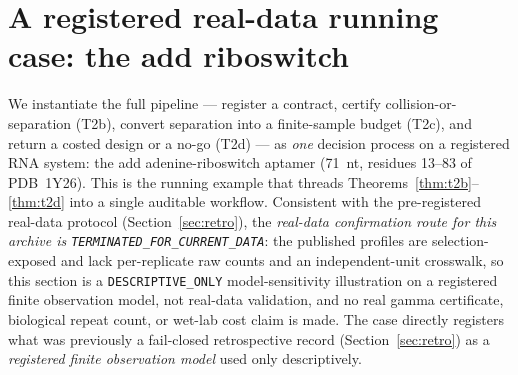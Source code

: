 \documentclass[11pt]{article}
\begin{document}
\section{A registered real-data running case: the add riboswitch}\label{sec:real}

We instantiate the full pipeline --- register a contract, certify collision-or-separation (T2b),
convert separation into a finite-sample budget (T2c), and return a costed design or a no-go (T2d) ---
as \emph{one} decision process on a registered RNA system: the add adenine-riboswitch aptamer
(71~nt, residues 13--83 of PDB~1Y26). This is the running example that threads
Theorems~\ref{thm:t2b}--\ref{thm:t2d} into a single auditable workflow. Consistent with the
pre-registered real-data protocol (Section~\ref{sec:retro}), the \emph{real-data confirmation route
for this archive is \texttt{TERMINATED\_FOR\_CURRENT\_DATA}}: the published profiles are
selection-exposed and lack per-replicate raw counts and an independent-unit crosswalk, so this section
is a \texttt{DESCRIPTIVE\_ONLY} model-sensitivity illustration on a registered finite observation
model, not real-data validation, and no real gamma certificate, biological repeat count, or wet-lab
cost claim is made. The case directly registers what was previously a fail-closed retrospective record
(Section~\ref{sec:retro}) as a \emph{registered finite observation model} used only descriptively.
\end{document}
